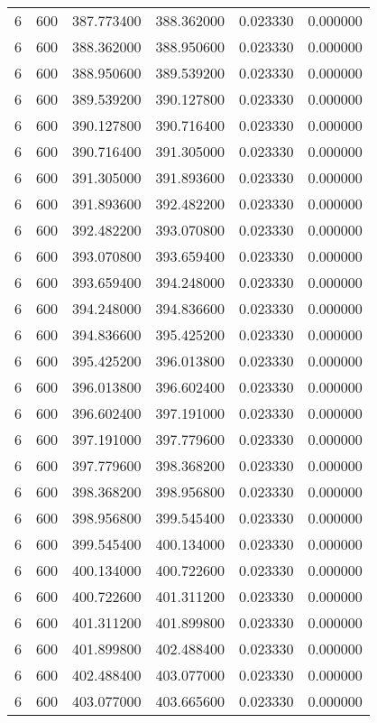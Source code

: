 \begin{longtable}{rrrrrr}
6 & 600 & 387.773400 & 388.362000 & 0.023330 & 0.000000 \\
6 & 600 & 388.362000 & 388.950600 & 0.023330 & 0.000000 \\
6 & 600 & 388.950600 & 389.539200 & 0.023330 & 0.000000 \\
6 & 600 & 389.539200 & 390.127800 & 0.023330 & 0.000000 \\
6 & 600 & 390.127800 & 390.716400 & 0.023330 & 0.000000 \\
6 & 600 & 390.716400 & 391.305000 & 0.023330 & 0.000000 \\
6 & 600 & 391.305000 & 391.893600 & 0.023330 & 0.000000 \\
6 & 600 & 391.893600 & 392.482200 & 0.023330 & 0.000000 \\
6 & 600 & 392.482200 & 393.070800 & 0.023330 & 0.000000 \\
6 & 600 & 393.070800 & 393.659400 & 0.023330 & 0.000000 \\
6 & 600 & 393.659400 & 394.248000 & 0.023330 & 0.000000 \\
6 & 600 & 394.248000 & 394.836600 & 0.023330 & 0.000000 \\
6 & 600 & 394.836600 & 395.425200 & 0.023330 & 0.000000 \\
6 & 600 & 395.425200 & 396.013800 & 0.023330 & 0.000000 \\
6 & 600 & 396.013800 & 396.602400 & 0.023330 & 0.000000 \\
6 & 600 & 396.602400 & 397.191000 & 0.023330 & 0.000000 \\
6 & 600 & 397.191000 & 397.779600 & 0.023330 & 0.000000 \\
6 & 600 & 397.779600 & 398.368200 & 0.023330 & 0.000000 \\
6 & 600 & 398.368200 & 398.956800 & 0.023330 & 0.000000 \\
6 & 600 & 398.956800 & 399.545400 & 0.023330 & 0.000000 \\
6 & 600 & 399.545400 & 400.134000 & 0.023330 & 0.000000 \\
6 & 600 & 400.134000 & 400.722600 & 0.023330 & 0.000000 \\
6 & 600 & 400.722600 & 401.311200 & 0.023330 & 0.000000 \\
6 & 600 & 401.311200 & 401.899800 & 0.023330 & 0.000000 \\
6 & 600 & 401.899800 & 402.488400 & 0.023330 & 0.000000 \\
6 & 600 & 402.488400 & 403.077000 & 0.023330 & 0.000000 \\
6 & 600 & 403.077000 & 403.665600 & 0.023330 & 0.000000 \\

\end{longtable}

